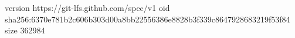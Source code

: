 version https://git-lfs.github.com/spec/v1
oid sha256:6370e781b2c606b303d00a8bb22556386e8828b3f339c8647928683219f53f84
size 362984
